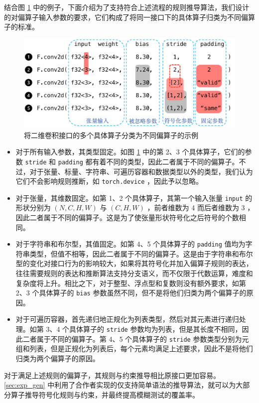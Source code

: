 结合图 \ref{fig:conv2d} 中的例子，下面介绍为了支持符合上述流程的规则推导算法，我们设计的对偏算子输入参数的要求，它们构成了将同一接口下的具体算子归类为不同偏算子的标准。

\begin{figure}
    \centering
    \includegraphics[width=1.\linewidth]{figures/conv2d.pdf}
    \caption{将二维卷积接口的多个具体算子分类为不同偏算子的示例}
    \label{fig:conv2d}
\end{figure}

\begin{itemize}
    \item 对于所有输入参数，其类型固定。如图 \ref{fig:conv2d} 中的第 2、3 个具体算子，它们的参数 \texttt{stride} 和 \texttt{padding} 都有着不同的类型，因此二者属于不同的偏算子。不过，对于张量、标量、字符串、可遍历容器和数据类型以外的类型，我们认为它们不会影响规则推断，如 \texttt{torch.device} ，因此予以忽略。
    \item 对于张量，其维数固定。如第 1、2 个具体算子，其第一个输入张量 \texttt{input} 的形状分别为 $(N, C, H, W)$ 与 $(C, H, W)$ ，前者维数为 4 而后者维数为 3 ，因此二者属于不同的偏算子。这是为了使张量形状符号化之后符号的个数相同。
    \item 对于字符串和布尔型，其值固定。如第 4、5 个具体算子的 \texttt{padding} 值均为字符串类型，但值不相等，因此二者属于不同的偏算子。这是由于字符串和布尔型的变化对接口行为的影响较大，如果将其符号化并加入偏算子规则的表达，往往需要规则的表达和推断算法支持分支语义，而不仅限于代数运算，难度和复杂度将上升。相比之下，对于整型、浮点型和复数则没有额外要求，如第 2、3 个具体算子的 \texttt{bias} 参数虽然不同，但不是将他们归类为两个偏算子的原因。
    \item 对于可遍历容器，首先递归地正规化为列表类型，然后对其元素进行递归处理。如第 3、4 个具体算子的 \texttt{stride} 参数均为列表，但是其长度不相同，因此二者属于不同的偏算子。第 4、5 个具体算子的 \texttt{stride} 参数类型分别为元组和列表，但是正规化为列表后，每个元素均满足上述要求，因此不是将他们归类为两个偏算子的原因。
\end{itemize}
对于满足上述规则的偏算子，其规则与约束推导相比原接口更加容易。
\ref{sec:exp_gen} 中利用了合作者实现的仅支持简单语法的推导算法，就可以为大部分算子推导符号化规则与约束，并最终提高模糊测试的覆盖率。

